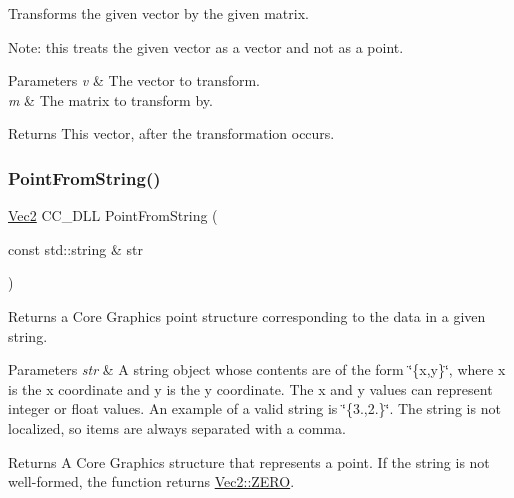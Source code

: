 Transforms the given vector by the given matrix.

Note\+: this treats the given vector as a vector and not as a point.


\begin{DoxyParams}{Parameters}
{\em v} & The vector to transform. \\
\hline
{\em m} & The matrix to transform by. \\
\hline
\end{DoxyParams}
\begin{DoxyReturn}{Returns}
This vector, after the transformation occurs. 
\end{DoxyReturn}
\mbox{\label{group__base_ga53f75124b92b17a0a61e956597a04335}} 
\subsubsection{\texorpdfstring{Point\+From\+String()}{PointFromString()}}
{\footnotesize\ttfamily \hyperlink{classVec2}{Vec2} C\+C\+\_\+\+D\+LL Point\+From\+String (\begin{DoxyParamCaption}\item[{const std\+::string \&}]{str }\end{DoxyParamCaption})}



Returns a Core Graphics point structure corresponding to the data in a given string. 


\begin{DoxyParams}{Parameters}
{\em str} & A string object whose contents are of the form \char`\"{}\{x,y\}\char`\"{}, where x is the x coordinate and y is the y coordinate. The x and y values can represent integer or float values. An example of a valid string is \char`\"{}\{3.,2.\}\char`\"{}. The string is not localized, so items are always separated with a comma. \\
\hline
\end{DoxyParams}
\begin{DoxyReturn}{Returns}
A Core Graphics structure that represents a point. If the string is not well-\/formed, the function returns \hyperlink{classVec2_a5c80e2e7c8bd2adcbad2844d060e6245}{Vec2\+::\+Z\+E\+RO}. 
\end{DoxyReturn}
\mbox{\label{group__base_ga625692e695f126833dfcb4f12ee62a89}} 
